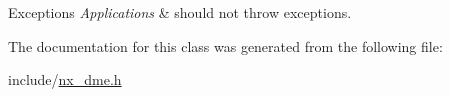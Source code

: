 \begin{DoxyExceptions}{Exceptions}
{\em Applications} & should not throw exceptions. \\
\hline
\end{DoxyExceptions}


The documentation for this class was generated from the following file\+:\begin{DoxyCompactItemize}
\item 
include/\mbox{\hyperlink{nx__dme_8h}{nx\+\_\+dme.\+h}}\end{DoxyCompactItemize}
